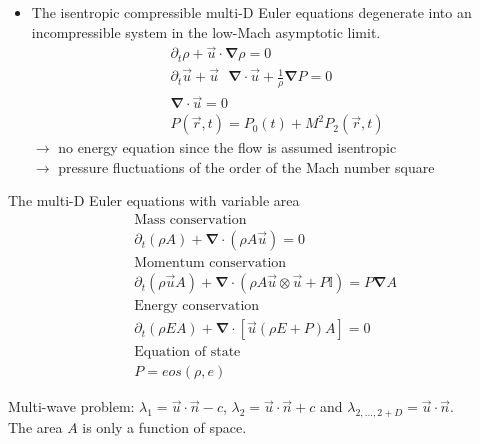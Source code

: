 \documentclass[xcolor=dvipsnames,10pt]{beamer}
\renewcommand{\div}{\boldsymbol{\nabla}\! \cdot \!}
\newcommand{\grad}{\boldsymbol{\nabla}}
\begin{document}
\begin{frame}
\begin{block}{}
\begin{itemize}
\setlength{\itemsep}{10pt}
\item The isentropic compressible multi-D Euler equations degenerate into an incompressible system in the low-Mach asymptotic limit.
\begin{align}
&\partial_t \rho + \vec{u} \cdot \grad \rho = 0 \nonumber \\
&\partial_t \vec{u} + \vec{u}\text{ } \div \vec{u} + \frac{1}{\rho}\grad P = 0 \nonumber \\
& \div \vec{u} = 0 \nonumber \\
&P( \vec{r},t) = P_0(t) + M^2 P_2(\vec{r},t)\nonumber
\end{align}
$\to$ no energy equation since the flow is assumed isentropic \\
$\to$ pressure fluctuations of the order of the Mach number square
\end{itemize}
\end{block}
\end{frame}
\begin{frame}
\begin{block}{The multi-D Euler equations with variable area}
\begin{align}
&\text{Mass conservation} \nonumber \\
&\partial_t ( \rho A ) + \div \left( \rho A \vec{u} \right) = 0 \nonumber \\
&\text{Momentum conservation} \nonumber \\
&\partial_t ( \rho \vec{u} A ) + \div \left( \rho A \vec{u} \otimes \vec{u} + P \mathbb{I} \right) = P \grad A \nonumber \\
&\text{Energy conservation} \nonumber \\
&\partial_t ( \rho E A ) + \div \left[ \vec{u} \left( \rho E + P \right) A \right] = 0 \nonumber \\
&\text{Equation of state} \nonumber \\
& P = eos \left( \rho, e \right) \nonumber 
\end{align}
\end{block}
Multi-wave problem: $\lambda_1 = \vec{u} \cdot \vec{n} - c $, $\lambda_2 = \vec{u} \cdot \vec{n} + c $ and $\lambda_{2, \dots, 2+D} = \vec{u} \cdot \vec{n}$. \\
The area $A$ is only a function of space.
\end{frame}
\end{document}
